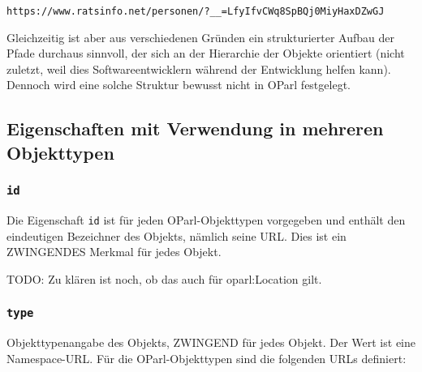 \documentclass[,a4paper]{article}
\begin{document}
\begin{verbatim}
https://www.ratsinfo.net/personen/?__=LfyIfvCWq8SpBQj0MiyHaxDZwGJ
\end{verbatim}

Gleichzeitig ist aber aus verschiedenen Gründen ein strukturierter
Aufbau der Pfade durchaus sinnvoll, der sich an der Hierarchie der
Objekte orientiert (nicht zuletzt, weil dies Softwareentwicklern während
der Entwicklung helfen kann). Dennoch wird eine solche Struktur bewusst
nicht in OParl festgelegt.

\subsection{Eigenschaften mit Verwendung in mehreren
Objekttypen}\label{eigenschaften-mit-verwendung-in-mehreren-objekttypen}

\subsubsection{\texttt{id}}\label{id}

Die Eigenschaft \texttt{id} ist für jeden OParl-Objekttypen vorgegeben
und enthält den eindeutigen Bezeichner des Objekts, nämlich seine URL.
Dies ist ein ZWINGENDES Merkmal für jedes Objekt.

TODO: Zu klären ist noch, ob das auch für oparl:Location gilt.

\subsubsection{\texttt{type}}\label{type}

Objekttypenangabe des Objekts, ZWINGEND für jedes Objekt. Der Wert ist
eine Namespace-URL. Für die OParl-Objekttypen sind die folgenden URLs
definiert:
\end{document}
